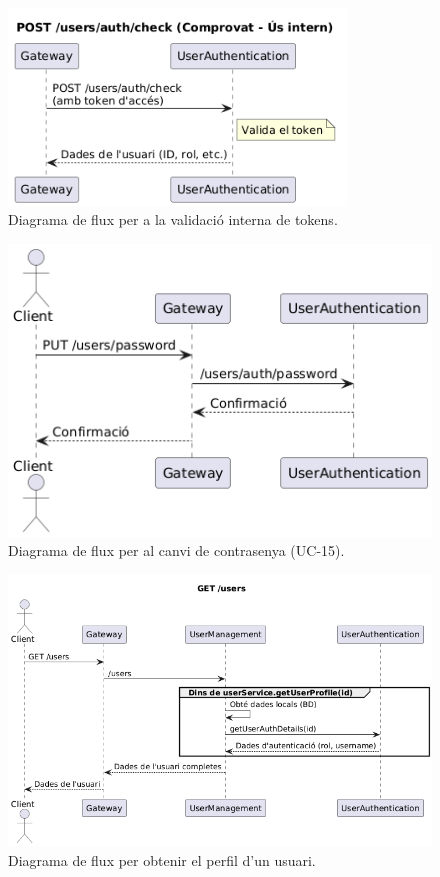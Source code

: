 \begin{figure}[H]
    \centering
    \includegraphics[width=0.8\textwidth]{Figures/flux/validar_tokens.png}
    \caption{Diagrama de flux per a la validació interna de tokens.}
    \label{fig:flow_validate_tokens}
\end{figure}

\begin{figure}[H]
    \centering
    \includegraphics[width=1\textwidth]{Figures/flux/change_password_user.png}
    \caption{Diagrama de flux per al canvi de contrasenya (UC-15).}
    \label{fig:flow_change_password}
\end{figure}

\begin{figure}[H]
    \centering
    \includegraphics[width=1\textwidth]{Figures/flux/get_user_info.png}
    \caption{Diagrama de flux per obtenir el perfil d'un usuari.}
    \label{fig:flow_get_user_info}
\end{figure}

